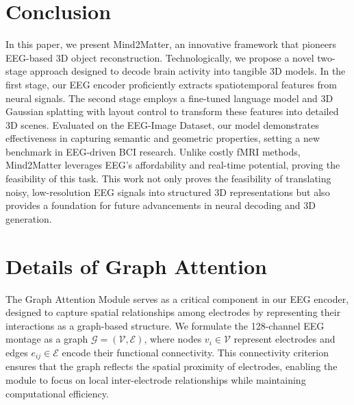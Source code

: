 \documentclass[sigconf]{acmart}
\begin{document}
\section{Conclusion}
In this paper, we present Mind2Matter, an innovative framework that pioneers EEG-based 3D object reconstruction. Technologically, we propose a novel two-stage approach designed to decode brain activity into tangible 3D models. In the first stage, our EEG encoder proficiently extracts spatiotemporal features from neural signals. The second stage employs a fine-tuned language model and 3D Gaussian splatting with layout control to transform these features into detailed 3D scenes. Evaluated on the EEG-Image Dataset, our model demonstrates effectiveness in capturing semantic and geometric properties, setting a new benchmark in EEG-driven BCI research. Unlike costly fMRI methods, Mind2Matter leverages EEG’s affordability and real-time potential, proving the feasibility of this task. This work not only proves the feasibility of translating noisy, low-resolution EEG signals into structured 3D representations but also provides a foundation for future advancements in neural decoding and 3D generation.






\appendix

\section{Details of Graph Attention}
The Graph Attention Module serves as a critical component in our EEG encoder, designed to capture spatial relationships among electrodes by representing their interactions as a graph-based structure. We formulate the 128-channel EEG montage as a graph $\mathcal{G} = (\mathcal{V}, \mathcal{E})$, where nodes $v_i \in \mathcal{V}$ represent electrodes and edges $e_{ij} \in \mathcal{E}$ encode their functional connectivity. This connectivity criterion ensures that the graph reflects the spatial proximity of electrodes, enabling the module to focus on local inter-electrode relationships while maintaining computational efficiency.
\end{document}
